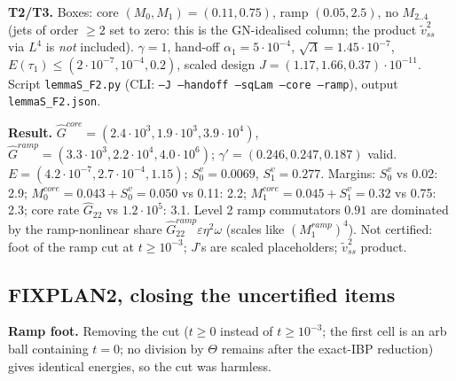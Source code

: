 \documentclass[11pt]{article}
\begin{document}
\textbf{T2/T3.} Boxes: core $(M_0,M_1)=(0.11,0.75)$, ramp $(0.05,2.5)$, no $M_{2..4}$ (jets of order $\ge2$ set to zero: this is the GN-idealised column; the product $\tilde v_{ss}^2$ via $L^4$ is \emph{not} included). $\gamma=1$, hand-off $\alpha_1=5\cdot10^{-4}$, $\sqrt\Lambda=1.45\cdot10^{-7}$, $E(\tau_1)\le(2\cdot10^{-7},10^{-4},0.2)$, scaled design $J=(1.17,1.66,0.37)\cdot10^{-11}$. Script \texttt{lemmaS\_F2.py} (CLI: \texttt{--J --handoff --sqLam --core --ramp}), output \texttt{lemmaS\_F2.json}.

\textbf{Result.} $\hat G^{core}=(2.4\cdot10^3,1.9\cdot10^3,3.9\cdot10^4)$, $\hat G^{ramp}=(3.3\cdot10^3,2.2\cdot10^4,4.0\cdot10^6)$; $\gamma'=(0.246,0.247,0.187)$ valid. $E=(4.2\cdot10^{-7},2.7\cdot10^{-4},1.15)$; $S_0^v=0.0069$, $S_1^v=0.277$. Margins: $S_0^v$ vs 0.02: 2.9; $M_0^{core}=0.043+S_0^v=0.050$ vs 0.11: 2.2; $M_1^{core}=0.045+S_1^v=0.32$ vs 0.75: 2.3; core rate $\hat G_{22}$ vs $1.2\cdot10^5$: 3.1. Level 2 ramp commutators $0.91$ are dominated by the ramp-nonlinear share $\hat G^{ramp}_{22}\varepsilon\eta^2\omega$ (scales like $(M_1^{ramp})^4$). Not certified: foot of the ramp cut at $t\ge10^{-3}$; $J$'s are scaled placeholders; $\tilde v_{ss}^2$ product.
\subsection*{FIXPLAN2, closing the uncertified items}
\textbf{Ramp foot.} Removing the cut ($t\ge0$ instead of $t\ge10^{-3}$; the first cell is an arb ball containing $t=0$; no division by $\Theta$ remains after the exact-IBP reduction) gives identical energies, so the cut was harmless.
\end{document}
